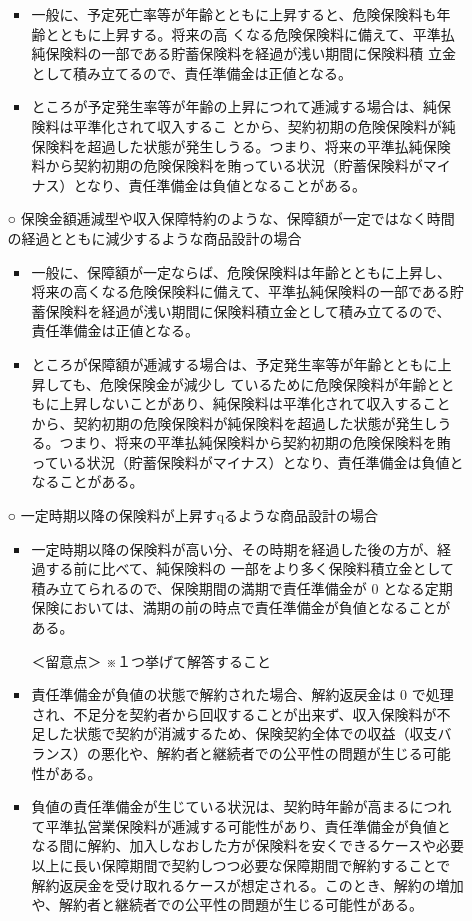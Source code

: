 \documentclass[report,gutter=10mm,fore-edge=10mm,uplatex,dvipdfmx]{jlreq}
\begin{document}
\begin{itemize}
\begin{itemize}
\begin{itemize}
  \item 一般に、予定死亡率等が年齢とともに上昇すると、危険保険料も年齢とともに上昇する。将来の高 くなる危険保険料に備えて、平準払純保険料の一部である貯蓄保険料を経過が浅い期間に保険料積 立金として積み立てるので、責任準備金は正値となる。
 \item ところが予定発生率等が年齢の上昇につれて逓減する場合は、純保険料は平準化されて収入するこ とから、契約初期の危険保険料が純保険料を超過した状態が発生しうる。つまり、将来の平準払純保険料から契約初期の危険保険料を賄っている状況（貯蓄保険料がマイナス）となり、責任準備金は負値となることがある。
\end{itemize} 
\item  [○]保険金額逓減型や収入保障特約のような、保障額が一定ではなく時間の経過とともに減少するような商品設計の場合
\begin{itemize}
  \item 一般に、保障額が一定ならば、危険保険料は年齢とともに上昇し、将来の高くなる危険保険料に備えて、平準払純保険料の一部である貯蓄保険料を経過が浅い期間に保険料積立金として積み立てるので、責任準備金は正値となる。
 \item  ところが保障額が逓減する場合は、予定発生率等が年齢とともに上昇しても、危険保険金が減少し ているために危険保険料が年齢とともに上昇しないことがあり、純保険料は平準化されて収入することから、契約初期の危険保険料が純保険料を超過した状態が発生しうる。つまり、将来の平準払純保険料から契約初期の危険保険料を賄っている状況（貯蓄保険料がマイナス）となり、責任準備金は負値となることがある。
\end{itemize} 
\item  [○]一定時期以降の保険料が上昇すqるような商品設計の場合
\begin{itemize}
  \item  一定時期以降の保険料が高い分、その時期を経過した後の方が、経過する前に比べて、純保険料の 一部をより多く保険料積立金として積み立てられるので、保険期間の満期で責任準備金が 0 となる定期保険においては、満期の前の時点で責任準備金が負値となることがある。
 \item  [＜留意点＞]※１つ挙げて解答すること
 \item  責任準備金が負値の状態で解約された場合、解約返戻金は 0 で処理され、不足分を契約者から回収することが出来ず、収入保険料が不足した状態で契約が消滅するため、保険契約全体での収益（収支バランス）の悪化や、解約者と継続者での公平性の問題が生じる可能性がある。
 \item 負値の責任準備金が生じている状況は、契約時年齢が高まるにつれて平準払営業保険料が逓減する可能性があり、責任準備金が負値となる間に解約、加入しなおした方が保険料を安くできるケースや必要以上に長い保障期間で契約しつつ必要な保障期間で解約することで解約返戻金を受け取れるケースが想定される。このとき、解約の増加や、解約者と継続者での公平性の問題が生じる可能性がある。
\end{itemize}
\end{itemize}
\end{itemize}
\end{document}
